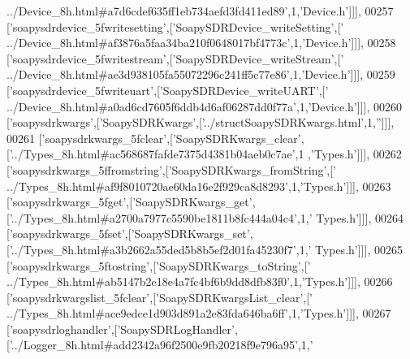 \begin{DoxyCode}
{      ../Device\_8h.html#a7d6cdef635ff1eb734aefd3fd411ed89'},1,\textcolor{stringliteral}{'Device.h'}]]],
00257   [\textcolor{stringliteral}{'soapysdrdevice\_5fwritesetting'},[\textcolor{stringliteral}{'SoapySDRDevice\_writeSetting'},[\textcolor{stringliteral}{'
      ../Device\_8h.html#af3876a5faa34ba210f0648017bf4773c'},1,\textcolor{stringliteral}{'Device.h'}]]],
00258   [\textcolor{stringliteral}{'soapysdrdevice\_5fwritestream'},[\textcolor{stringliteral}{'SoapySDRDevice\_writeStream'},[\textcolor{stringliteral}{'
      ../Device\_8h.html#ae3d938105fa55072296c241ff5c77e86'},1,\textcolor{stringliteral}{'Device.h'}]]],
00259   [\textcolor{stringliteral}{'soapysdrdevice\_5fwriteuart'},[\textcolor{stringliteral}{'SoapySDRDevice\_writeUART'},[\textcolor{stringliteral}{'
      ../Device\_8h.html#a0ad6cd7605f6ddb4d6af06287dd0f77a'},1,\textcolor{stringliteral}{'Device.h'}]]],
00260   [\textcolor{stringliteral}{'soapysdrkwargs'},[\textcolor{stringliteral}{'SoapySDRKwargs'},[\textcolor{stringliteral}{'../structSoapySDRKwargs.html'},1,\textcolor{stringliteral}{''}]]],
00261   [\textcolor{stringliteral}{'soapysdrkwargs\_5fclear'},[\textcolor{stringliteral}{'SoapySDRKwargs\_clear'},[\textcolor{stringliteral}{'../Types\_8h.html#ac568687fafde7375d4381b04aeb0c7ae'},1
      ,\textcolor{stringliteral}{'Types.h'}]]],
00262   [\textcolor{stringliteral}{'soapysdrkwargs\_5ffromstring'},[\textcolor{stringliteral}{'SoapySDRKwargs\_fromString'},[\textcolor{stringliteral}{'
      ../Types\_8h.html#af9f8010720ae60da16e2f929ca8d8293'},1,\textcolor{stringliteral}{'Types.h'}]]],
00263   [\textcolor{stringliteral}{'soapysdrkwargs\_5fget'},[\textcolor{stringliteral}{'SoapySDRKwargs\_get'},[\textcolor{stringliteral}{'../Types\_8h.html#a2700a7977c5590be1811b8fc444a04c4'},1,\textcolor{stringliteral}{'
      Types.h'}]]],
00264   [\textcolor{stringliteral}{'soapysdrkwargs\_5fset'},[\textcolor{stringliteral}{'SoapySDRKwargs\_set'},[\textcolor{stringliteral}{'../Types\_8h.html#a3b2662a55ded5b8b5ef2d01fa45230f7'},1,\textcolor{stringliteral}{'
      Types.h'}]]],
00265   [\textcolor{stringliteral}{'soapysdrkwargs\_5ftostring'},[\textcolor{stringliteral}{'SoapySDRKwargs\_toString'},[\textcolor{stringliteral}{'
      ../Types\_8h.html#ab5147b2e18e4a7fc4bf6b9dd8dfb83f0'},1,\textcolor{stringliteral}{'Types.h'}]]],
00266   [\textcolor{stringliteral}{'soapysdrkwargslist\_5fclear'},[\textcolor{stringliteral}{'SoapySDRKwargsList\_clear'},[\textcolor{stringliteral}{'
      ../Types\_8h.html#ace9edce1d903d891a2e83fda646ba6ff'},1,\textcolor{stringliteral}{'Types.h'}]]],
00267   [\textcolor{stringliteral}{'soapysdrloghandler'},[\textcolor{stringliteral}{'SoapySDRLogHandler'},[\textcolor{stringliteral}{'../Logger\_8h.html#add2342a96f2500e9fb20218f9e796a95'},1,\textcolor{stringliteral}{'
}
\end{DoxyCode}
